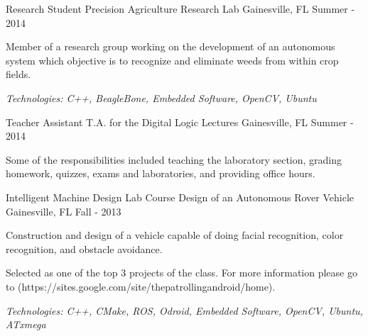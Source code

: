 \begin{cventries}
	\cventry
		{Research Student} %
		{Precision Agriculture Research Lab} %
		{Gainesville, FL} %
		{Summer - 2014} %
		{
			\begin{cvitems} %
			\item {Member of a research group working on the development of an autonomous system which 
				objective is to recognize and eliminate weeds from within crop fields.}
			\item {\it{Technologies:} C++, BeagleBone, Embedded Software, OpenCV, Ubuntu}
			\end{cvitems}
		}

	\cventry
		{Teacher Assistant} %
		{T.A. for the Digital Logic Lectures} %
		{Gainesville, FL} %
		{Summer - 2014} %
		{
			\begin{cvitems} %
			\item {Some of the responsibilities included teaching the laboratory section, grading homework, quizzes, exams and
				laboratories, and providing office hours.}
			\end{cvitems}
		}

	\cventry
		{Intelligent Machine Design Lab Course} %
		{Design of an Autonomous Rover Vehicle} %
		{Gainesville, FL} %
		{Fall - 2013} %
		{
			\begin{cvitems} %
				\item {Construction and design of a vehicle capable of doing facial recognition, color recognition, and
					obstacle avoidance.}
				\item {Selected as one of the top 3 projects of the class. For more information please go to
					(https://sites.google.com/site/thepatrollingandroid/home).}
				\item {\it{Technologies:} C++, CMake, ROS, Odroid, Embedded Software, OpenCV, Ubuntu, ATxmega}
			\end{cvitems}
		}

\end{cventries}
